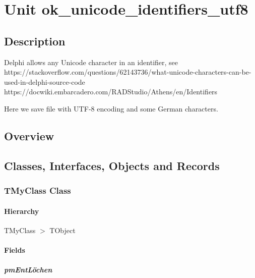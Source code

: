 \documentclass{report}
\begin{document}
\newlength{\tmplength}
\chapter{Unit ok{\_}unicode{\_}identifiers{\_}utf8}
\section{Description}
Delphi allows any Unicode character in an identifier, see https://stackoverflow.com/questions/62143736/what-unicode-characters-can-be-used-in-delphi-source-code https://docwiki.embarcadero.com/RADStudio/Athens/en/Identifiers

Here we save file with UTF{-}8 encoding and some German characters.
\section{Overview}
\begin{description}
\item[\texttt{\begin{ttfamily}TMyClass\end{ttfamily} Class}]
\item[\texttt{\begin{ttfamily}TfrmArbeitsÜbersicht\end{ttfamily} Class}]
\end{description}
\section{Classes, Interfaces, Objects and Records}
\subsection*{TMyClass Class}
\subsubsection*{\large{\textbf{Hierarchy}}\normalsize\hspace{1ex}\hfill}
TMyClass {$>$} TObject
\subsubsection*{\large{\textbf{Fields}}\normalsize\hspace{1ex}\hfill}
\paragraph*{pmEntLöchen}\hspace*{\fill}
\end{document}
